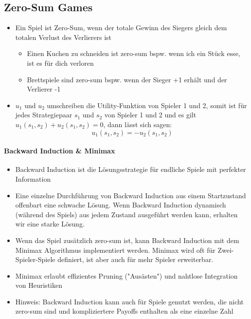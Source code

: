\documentclass[a4paper]{article}
\begin{document}
		\newpage
	
		\subsection{Zero-Sum Games}
		
		\begin{itemize}
			\item Ein Spiel ist Zero-Sum, wenn der totale Gewinn des Siegers gleich dem totalen Verlust des Verlierers ist
				\begin{itemize}
					\item Einen Kuchen zu schneiden ist zero-sum bspw. wenn ich ein Stück esse, ist es für dich verloren
					\item Brettspiele sind zero-sum bspw. wenn der Sieger +1 erhält und der Verlierer -1
				\end{itemize}
			\item $u_{1}$ und $u_{2}$ umschreiben die Utility-Funktion von Spieler 1 und 2, somit ist für jedes Strategiepaar $s_{1}$ und $s_{2}$ von Spieler 1 und 2 und es gilt $u_{1}(s_{1}, s_{2}) + u_{2}(s_{1}, s_{2}) = 0$, dann lässt sich sagen: \\
			$$u_{1}(s_{1}, s_{2}) = -u_{2}(s_{1}, s_{2})$$
		\end{itemize}
	
		\paragraph{Backward Induction \& Minimax}
		
		\begin{itemize}
			\item Backward Induction ist die Lösungsstrategie für endliche Spiele mit perfekter Information
			\item Eine einzelne Durchführung von Backward Induction aus einem Startzustand offenbart eine schwache Lösung.
			Wenn Backward Induction dynamisch (während des Spiels) aus jedem Zustand ausgeführt werden kann, erhalten wir eine starke Lösung.
			\item Wenn das Spiel zusätzlich zero-sum ist, kann Backward Induction mit dem Minimax Algorithmus implementiert werden.
			Minimax wird oft für Zwei-Spieler-Spiele definiert, ist aber auch für mehr Spieler erweiterbar.
			\item Minimax erlaubt effizientes Pruning ("Ausästen") und nahtlose Integration von Heuristiken
			\item Hinweis: Backward Induction kann auch für Spiele genutzt werden, die nicht zero-sum sind und kompliziertere Payoffs enthalten als eine einzelne Zahl
		\end{itemize}
	
\end{document}
